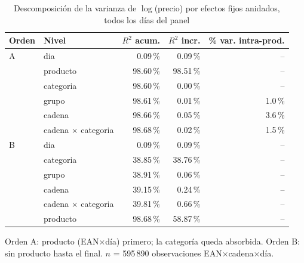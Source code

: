 \begin{table}[htbp]
\caption{Descomposici\'on de la varianza de $\log$(precio) por efectos fijos anidados, todos los d\'ias del panel}
\label{tab:varianza}
\centering\scriptsize\setlength{\tabcolsep}{3pt}
\begin{tabular}{@{}llrrr@{}}
\toprule
Orden & Nivel & $R^2$ acum. & $R^2$ incr. & \% var. intra-prod. \\
\midrule
A & dia & 0.09\,\% & 0.09\,\% & -- \\
 & producto & 98.60\,\% & 98.51\,\% & -- \\
 & categoria & 98.60\,\% & 0.00\,\% & -- \\
 & grupo & 98.61\,\% & 0.01\,\% & 1.0\,\% \\
 & cadena & 98.66\,\% & 0.05\,\% & 3.6\,\% \\
 & cadena $\times$ categoria & 98.68\,\% & 0.02\,\% & 1.5\,\% \\
\midrule
B & dia & 0.09\,\% & 0.09\,\% & -- \\
 & categoria & 38.85\,\% & 38.76\,\% & -- \\
 & grupo & 38.91\,\% & 0.06\,\% & -- \\
 & cadena & 39.15\,\% & 0.24\,\% & -- \\
 & cadena $\times$ categoria & 39.81\,\% & 0.66\,\% & -- \\
 & producto & 98.68\,\% & 58.87\,\% & -- \\
\bottomrule\end{tabular}
\par\smallskip\raggedright\scriptsize Orden A: producto (EAN$\times$d\'ia) primero; la categor\'ia queda absorbida. Orden B: sin producto hasta el final. $n$ = 595\,890 observaciones EAN$\times$cadena$\times$d\'ia.
\end{table}
